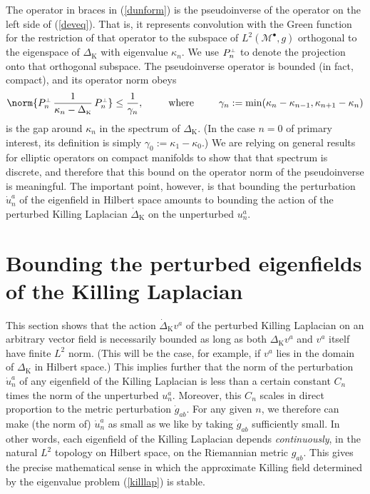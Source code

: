 \documentclass[12pt,letterpaper]{iopart}
\newcommand\Lap[1][K]{\Delta_{\scriptscriptstyle\mathrm{#1}}}
\newcommand\dLap[1][K]{\dot\Delta_{\scriptscriptstyle\mathrm{#1}}}
\newcommand\M{\mathcal{M}}
\newcommand\ind{{\bullet}}
\begin{document}
The operator in braces in (\ref{dunform}) is the pseudoinverse of the operator on the left side of (\ref{deveq}).  That is, it represents convolution with the Green function for the restriction of that operator to the subspace of $L^2(\M^\ind, g)$ orthogonal to the eigenspace of $\Lap$ with eigenvalue $\kappa_n$.  We use $P_n^{\scriptscriptstyle\perp}$ to denote the projection onto that orthogonal subspace.  The pseudoinverse operator is bounded (in fact, compact), and its operator norm obeys 
%
\begin{equation}\label{pinorm}
	\norm{P_n^\shortperp\, \frac{1}{\kappa_n - \Lap}\, P_n^\shortperp} \le \frac{1}{\gamma_n}, 
	\qquad\text{where}\qquad
	\gamma_n := \min (\kappa_n - \kappa_{n-1}, \kappa_{n+1} - \kappa_n)
\end{equation}
%
is the gap around $\kappa_n$ in the spectrum of $\Lap$.  (In the case $n = 0$ of primary interest, its definition is simply $\gamma_0 := \kappa_1 - \kappa_0$.)  We are relying on general results for elliptic operators on compact manifolds \cite{McLean,ChoquetBruhat} to show that that spectrum is discrete, and therefore that this bound on the operator norm of the pseudoinverse is meaningful.  The important point, however, is that bounding the perturbation $\dot u_n^a$ of the eigenfield in Hilbert space amounts to bounding the action of the perturbed Killing Laplacian $\dLap$ on the unperturbed $u_n^a$.


  
\section{Bounding the perturbed eigenfields of the Killing Laplacian}

This section shows that the action $\dLap v^a$ of the perturbed Killing Laplacian on an arbitrary vector field is necessarily bounded as long as both $\Lap v^a$ and $v^a$ itself have finite $L^2$ norm.  (This will be the case, for example, if $v^a$ lies in the domain of $\Lap$ in Hilbert space.)  This implies further that the norm of the perturbation $\dot u_n^a$ of any eigenfield of the Killing Laplacian is less than a certain constant $C_n$ times the norm of the unperturbed $u_n^a$.  Moreover, this $C_n$ scales in direct proportion to the metric perturbation $\dot g_{ab}$.  For any given $n$, we therefore can make (the norm of) $\dot u_n^a$ as small as we like by taking $\dot g_{ab}$ sufficiently small.  In other words, each eigenfield of the Killing Laplacian depends \textit{continuously}, in the natural $L^2$ topology on Hilbert space, on the Riemannian metric $g_{ab}$.  This gives the precise mathematical sense in which the approximate Killing field determined by the eigenvalue problem (\ref{killlap}) is stable.
\end{document}
